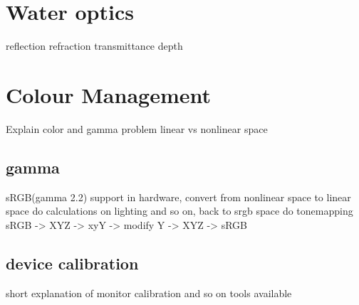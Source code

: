 \section{Water optics}
reflection
refraction
transmittance
depth

\section{Colour Management}
Explain color and gamma problem
linear vs nonlinear space

\subsection{gamma}
sRGB(gamma 2.2) support in hardware, convert from nonlinear space to linear
space do calculations on lighting and so on, back to srgb space
do tonemapping sRGB -> XYZ -> xyY -> modify Y -> XYZ -> sRGB

\subsection{device calibration}
short explanation of monitor calibration and so on
tools available
